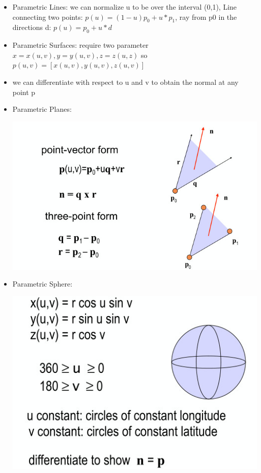 \documentclass[11pt,a4paper]{article}
\begin{document}
\begin{itemize}
		\item Parametric Lines: we can normalize u to be over the interval (0,1), Line connecting two points: $p(u)=(1-u)p_{0}+u*p_{1}$, ray from p0 in the directions d: $p(u)=p_{0}+u*d$
		\item Parametric Surfaces: require two parameter $x=x(u,v), y=y(u,v), z=z(u,z)$ so $p(u,v)=[x(u,v),y(u,v),z(u,v)]$
		\item we can differentiate with respect to u and v to obtain the normal at any point p
		\item Parametric Planes:
		\begin{center}
			\includegraphics[scale=0.5]{pictures/parametricplanes.jpg}
		\end{center}
		\item Parametric Sphere:
		\begin{center}
			\includegraphics[scale=0.5]{pictures/parametricsphere.jpg}
		\end{center}

\end{itemize}
\end{document}
